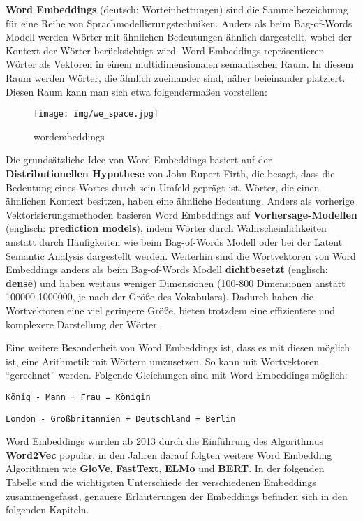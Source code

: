 \documentclass[11pt]{article}
\begin{document}
\textbf{Word Embeddings} (deutsch: Worteinbettungen) sind die
Sammelbezeichnung für eine Reihe von Sprachmodellierungstechniken.
Anders als beim Bag-of-Words Modell werden Wörter mit ähnlichen
Bedeutungen ähnlich dargestellt, wobei der Kontext der Wörter
berücksichtigt wird. Word Embeddings repräsentieren Wörter als Vektoren
in einem multidimensionalen semantischen Raum. In diesem Raum werden
Wörter, die ähnlich zueinander sind, näher beieinander platziert. Diesen
Raum kann man sich etwa folgendermaßen vorstellen:

\begin{figure}
\centering
\texttt{[image: img/we\_space.jpg]}
\caption{wordembeddings}
\end{figure}

    Die grundsätzliche Idee von Word Embeddings basiert auf der
\textbf{Distributionellen Hypothese} von John Rupert Firth, die besagt,
dass die Bedeutung eines Wortes durch sein Umfeld geprägt ist. Wörter,
die einen ähnlichen Kontext besitzen, haben eine ähnliche Bedeutung.
Anders als vorherige Vektorisierungsmethoden basieren Word Embeddings
auf \textbf{Vorhersage-Modellen} (englisch: \textbf{prediction models}),
indem Wörter durch Wahrscheinlichkeiten anstatt durch Häufigkeiten wie
beim Bag-of-Words Modell oder bei der Latent Semantic Analysis
dargestellt werden. Weiterhin sind die Wortvektoren von Word Embeddings
anders als beim Bag-of-Words Modell \textbf{dichtbesetzt} (englisch:
\textbf{dense}) und haben weitaus weniger Dimensionen (100-800
Dimensionen anstatt 100000-1000000, je nach der Größe des Vokabulars).
Dadurch haben die Wortvektoren eine viel geringere Größe, bieten
trotzdem eine effizientere und komplexere Darstellung der Wörter.

Eine weitere Besonderheit von Word Embeddings ist, dass es mit diesen
möglich ist, eine Arithmetik mit Wörtern umzusetzen. So kann mit
Wortvektoren ``gerechnet'' werden. Folgende Gleichungen sind mit Word
Embeddings möglich:

\texttt{König\ -\ Mann\ +\ Frau\ =\ Königin}

\texttt{London\ -\ Großbritannien\ +\ Deutschland\ =\ Berlin}

Word Embeddings wurden ab 2013 durch die Einführung des Algorithmus
\textbf{Word2Vec} populär, in den Jahren darauf folgten weitere Word
Embedding Algorithmen wie \textbf{GloVe}, \textbf{FastText},
\textbf{ELMo} und \textbf{BERT}. In der folgenden Tabelle sind die
wichtigsten Unterschiede der verschiedenen Embeddings zusammengefasst,
genauere Erläuterungen der Embeddings befinden sich in den folgenden
Kapiteln.
\end{document}
